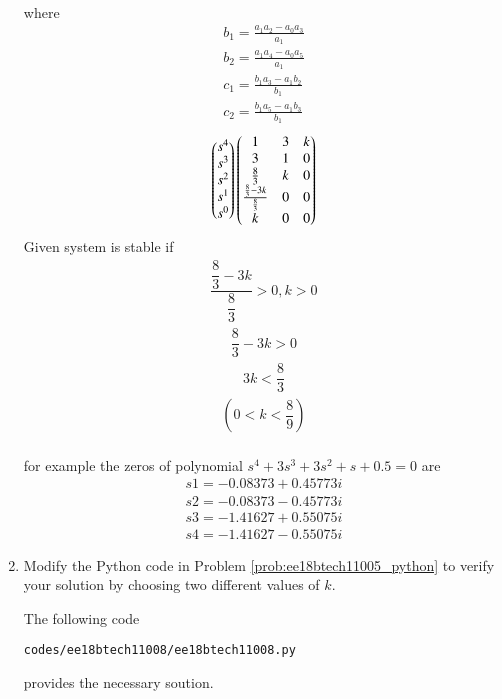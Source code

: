 \begin{enumerate}[label=\thesubsection.\arabic*.,ref=\thesubsection.\theenumi]
 \\
 where
 \begin{align}
 b_1 =\frac{ a_1a_2-a_0a_3}{a_1}  
 \\
 b_2 =\frac{ a_1a_4-a_0a_5}{a_1} 
 \\
 c_1=\frac{ b_1a_3-a_1b_2}{b_1} 
\\
 c_2=\frac{ b_1a_5-a_1b_3}{b_1}  
\end{align}
\bigskip
\begin{align}
\begin{pmatrix}s^4\\s^3\\s^2\\s^1 \\ s^0\end{pmatrix}
\begin{pmatrix}1 & 3 & k \\ 3 & 1 & 0\\  \frac{8}{3}& k & 0\\ \frac{\frac{8}{3}-3k}{\frac{8}{3}} & 0 & 0\\k & 0 & 0\end{pmatrix} 
\end{align}
Given system is stable if
\begin{align}
\dfrac{\dfrac{8}{3}-3k}{\dfrac{8}{3}}>0  ,  k>0
\end{align}
\begin{align}
{\dfrac{8}{3}-3k} >0
\end{align}
\begin{align}
3k<\dfrac{8}{3}
\end{align}
\begin{align}
(0<k<\dfrac{8}{9})
\end{align}
\bigskip
\\for example the zeros of polynomial $s^4+3s^3+3s^2+s+0.5=0$ are 
\begin{align}
s1=-0.08373+0.45773i
\end{align}
\begin{align}
s2=-0.08373-0.45773i
\end{align}
\begin{align}
s3=-1.41627+0.55075i
\end{align}
\begin{align}
s4=-1.41627-0.55075i
\end{align}

\item Modify the Python code in Problem \ref{prob:ee18btech11005_python} to verify your solution by choosing two different values of $k$.

\solution 
The following code 
%
\begin{lstlisting}
codes/ee18btech11008/ee18btech11008.py
\end{lstlisting}
%
provides the necessary soution.


\end{enumerate}

